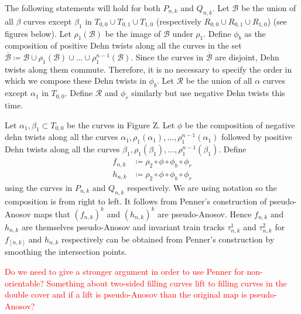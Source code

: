The following statements will hold for both $P_{n,k}$ and $Q_{n,k}$. Let $\mathcal{B}$ be the union of all $\beta$ curves except $\beta_1$ in $T_{0,0} \cup T_{0,1} \cup T_{1,0}$ (respectively $R_{0,0} \cup R_{0,1} \cup R_{1,0}$) (see figures below). Let $\rho_1(\mathcal{B})$ be the image of $\mathcal{B}$ under $\rho_1$. Define $\phi_b$ as the composition of positive Dehn twists along all the curves in the set $\overline{\mathcal{B}} \coloneqq \mathcal{B} \cup \rho_1(\mathcal{B}) \cup \dots \cup \rho_1^{n-1}(\mathcal{B})$. Since the curves in $\overline{\mathcal{B}}$ are disjoint, Dehn twists along them commute. Therefore, it is no necessary to specify the order in which we compose these Dehn twists in $\phi_b$. Let $\mathcal{R}$ be the union of all $\alpha$ curves except $\alpha_1$ in $T_{0,0}$. Define $\mathcal{R}$ and $\phi_r$ similarly but use negative Dehn twists this time.

Let $\alpha_1,\beta_1 \subset T_{0,0}$ be the curves in Figure Z. Let $\phi$ be the composition of negative dehn twists along all the curves $\alpha_1, \rho_1(\alpha_1), \dots, \rho_1^{n-1}(\alpha_1)$ followed by positive Dehn twists along all the curves $\beta_1,\rho_1(\beta_1),\dots,\rho_1^{n-1}(\beta_1)$. Define 
\begin{align*}
    f_{n,k} &\coloneqq \rho_2 \circ \phi \circ \phi_b \circ \phi_r \\
    h_{n,k} & \coloneqq \rho_2 \circ \phi \circ \phi_b \circ \phi_r
\end{align*}
using the curves in $P_{n,k}$ and $Q_{n,k}$ respectively. We are using notation so the composition is from right to left. It follows from Penner's construction of pseudo-Anosov maps that $(f_{n,k})^k$ and $(h_{n,k})^k$ are pseudo-Anosov. Hence $f_{n,k}$ and $h_{n,k}$ are themselves pseudo-Anosov and invariant train tracks $\tau^1_{n,k}$ and $\tau^2_{n,k}$ for $f_[n,k]$ and $h_{n,k}$ respectively can be obtained from Penner's construction by smoothing the intersection points.

\textcolor{red}{Do we need to give a stronger argument in order to use Penner for non-orientable? Something about two-sided filling curves lift to filling curves in the double cover and if a lift is pseudo-Anosov than the original map is pseudo-Anosov?}

